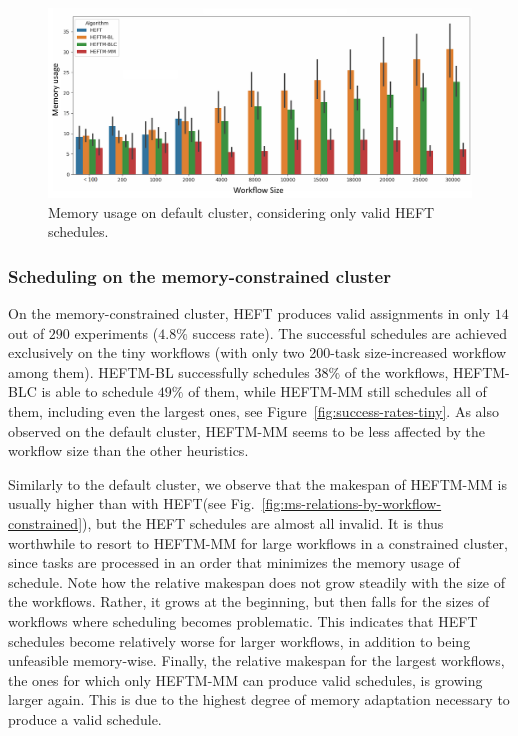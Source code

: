 \documentclass[conference]{IEEEtran}
\newcommand{\algo}[1]{\textsc{#1}}
\newcommand{\heft}{\algo{HEFT}\xspace}
\newcommand{\heftmm}{\algo{HEFTM-MM}\xspace}
\newcommand{\heftbl}{\algo{HEFTM-BL}\xspace}
\newcommand{\heftblc}{\algo{HEFTM-BLC}\xspace}
\newcommand{\new}[1]{{\color{blue}#1}}
\begin{document}
\begin{figure}[tb]
    \centering
    \includegraphics[width=1\columnwidth] {images/mem-usage-normal-onlyvalid2}
    \caption{Memory usage on default cluster, considering only valid \heft schedules. }
    \label{fig:mem-usages-onlyvalid}
\end{figure}



\subsubsection{Scheduling on the memory-constrained cluster}
\label{ss:mem-constrained-cluster}
%
On the memory-constrained cluster, \heft produces valid assignments in only $14$ out of $290$ experiments ($4.8\%$ success rate).
The successful schedules are achieved exclusively on the tiny workflows (with only two 200-task size-increased
workflow among them).
\heftbl successfully schedules $38\%$ of the workflows, \heftblc is able to schedule $49\%$ of them, while \heftmm
still schedules all of them, including even the largest ones, see Figure~\ref{fig:success-rates-tiny}.
As also observed on the default cluster, \heftmm seems to be less affected by the workflow size
than the other heuristics.

Similarly to the default cluster, we observe that the makespan of \heftmm is usually higher
than with \heft (see Fig.~\ref{fig:ms-relations-by-workflow-constrained}), but the \heft schedules are
almost all invalid. It is thus worthwhile to resort to \heftmm for large workflows
in a constrained cluster, since tasks are processed in an order that minimizes
the memory usage of schedule.
\new{Note how the relative makespan does not grow steadily with the size of the workflows.
Rather, it grows at the beginning, but then falls for the sizes of workflows where scheduling becomes problematic.
This indicates that \heft schedules become relatively worse for larger workflows, in addition to being unfeasible memory-wise.
Finally, the relative makespan for the largest workflows, the ones for which only \heftmm can produce valid schedules,
is growing larger again.
This is due to the highest degree of memory adaptation necessary to produce a valid schedule.
}
\end{document}
